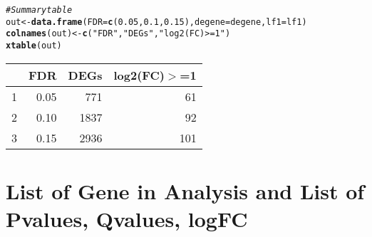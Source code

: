 \documentclass{article}\usepackage[]{graphicx}\usepackage[]{color}
\makeatletter
\newcommand{\hlnum}[1]{\textcolor[rgb]{0.686,0.059,0.569}{#1}}%
\newcommand{\hlstr}[1]{\textcolor[rgb]{0.192,0.494,0.8}{#1}}%
\newcommand{\hlcom}[1]{\textcolor[rgb]{0.678,0.584,0.686}{\textit{#1}}}%
\newcommand{\hlstd}[1]{\textcolor[rgb]{0.345,0.345,0.345}{#1}}%
\newcommand{\hlkwb}[1]{\textcolor[rgb]{0.69,0.353,0.396}{#1}}%
\newcommand{\hlkwc}[1]{\textcolor[rgb]{0.333,0.667,0.333}{#1}}%
\newcommand{\hlkwd}[1]{\textcolor[rgb]{0.737,0.353,0.396}{\textbf{#1}}}%
\newenvironment{kframe}{%
 \def\at@end@of@kframe{}%
 \ifinner\ifhmode%
  \def\at@end@of@kframe{\end{minipage}}%
  \begin{minipage}{\columnwidth}%
 \fi\fi%
 \def\FrameCommand##1{\hskip\@totalleftmargin \hskip-\fboxsep
 \colorbox{shadecolor}{##1}\hskip-\fboxsep
     \hskip-\linewidth \hskip-\@totalleftmargin \hskip\columnwidth}%
 \MakeFramed {\advance\hsize-\width
   \@totalleftmargin\z@ \linewidth\hsize
   \@setminipage}}%
 {\par\unskip\endMakeFramed%
 \at@end@of@kframe}
\makeatother
\begin{document}
\begin{kframe}
\begin{alltt}
\hlcom{# Summary table}
\hlstd{out} \hlkwb{<-} \hlkwd{data.frame}\hlstd{(}\hlkwc{FDR} \hlstd{=} \hlkwd{c}\hlstd{(}\hlnum{0.05}\hlstd{,} \hlnum{0.1}\hlstd{,} \hlnum{0.15}\hlstd{),} \hlkwc{degene} \hlstd{= degene,} \hlkwc{lf1} \hlstd{= lf1)}
\hlkwd{colnames}\hlstd{(out)} \hlkwb{<-} \hlkwd{c}\hlstd{(}\hlstr{"FDR"}\hlstd{,} \hlstr{"DEGs"}\hlstd{,} \hlstr{"log2(FC)>=1"}\hlstd{)}
\hlkwd{xtable}\hlstd{(out)}
\end{alltt}
\end{kframe}%
\begin{table}[ht]
\centering
\begin{tabular}{rrrr}
  \hline
 & FDR & DEGs & log2(FC)$>$=1 \\ 
  \hline
1 & 0.05 & 771 &  61 \\ 
  2 & 0.10 & 1837 &  92 \\ 
  3 & 0.15 & 2936 & 101 \\ 
   \hline
\end{tabular}
\end{table}




\section{List of Gene in Analysis and List of Pvalues, Qvalues, logFC}
\end{document}
